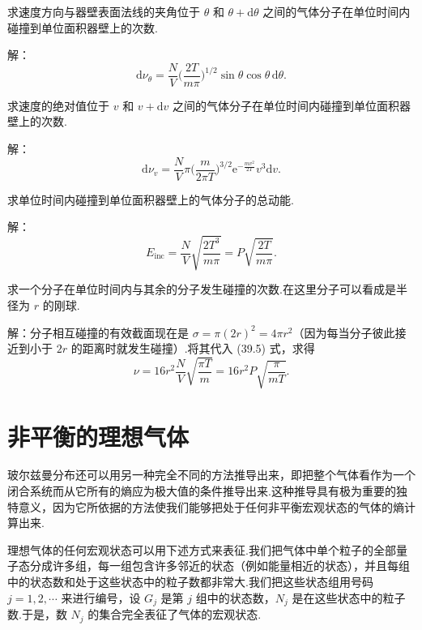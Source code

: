 \begin{xiti}

\quad 求速度方向与器壁表面法线的夹角位于 $\theta$ 和 $\theta+\mathrm{d}\theta$ 之间的气体分子在单位时间内碰撞到单位面积器壁上的次数.

解：
\begin{equation*}
  \mathrm{d}\nu_\theta=\frac{N}{V}\Big(\frac{2T}{m\pi}\Big)^{1/2}
  \sin\theta\cos\theta\,\mathrm{d}\theta.
\end{equation*}

\quad 求速度的绝对值位于 $v$ 和 $v+\mathrm{d}v$ 之间的气体分子在单位时间内碰撞到单位面积器壁上的次数.

解：
\begin{equation*}
  \mathrm{d}\nu_v=\frac{N}{V}\pi\Big(\frac{m}{2\pi T}\Big)^{3/2}
  \mathrm{e}^{-\frac{mv^2}{2T}}v^3\mathrm{d}v.
\end{equation*}

\quad 求单位时间内碰撞到单位面积器壁上的气体分子的总动能.

解：
\begin{equation*}
  E_{\mathrm{inc}}=\frac{N}{V}\sqrt{\frac{2T^3}{m\pi}}
  =P\sqrt{\frac{2T}{m\pi}}.
\end{equation*}

\quad 求一个分子在单位时间内与其余的分子发生碰撞的次数.在这里分子可以看成是半径为 $r$ 的刚球.

解：分子相互碰撞的有效截面现在是 $\sigma=\pi(2r)^2=4\pi r^2$（因为每当分子彼此接近到小于 $2r$ 的距离时就发生碰撞）.将其代入 (39.5) 式，求得
\begin{equation*}
  \nu=16r^2\frac{N}{V}\sqrt{\frac{\pi T}{m}}
  =16r^2P\sqrt{\frac{\pi}{mT}}.
\end{equation*}

\end{xiti}

\section{非平衡的理想气体}

玻尔兹曼分布还可以用另一种完全不同的方法推导出来，即把整个气体看作为一个闭合系统而从它所有的熵应为极大值的条件推导出来.这种推导具有极为重要的独特意义，因为它所依据的方法使我们能够把处于任何非平衡宏观状态的气体的熵计算出来.

理想气体的任何宏观状态可以用下述方式来表征.我们把气体中单个粒子的全部量子态分成许多组，每一组包含许多邻近的状态（例如能量相近的状态），并且每组中的状态数和处于这些状态中的粒子数都非常大.我们把这些状态组用号码 $j=1,2,\cdots$ 来进行编号，设 $G_j$ 是第 $j$ 组中的状态数，$N_j$ 是在这些状态中的粒子数.于是，数 $N_j$ 的集合完全表征了气体的宏观状态.

